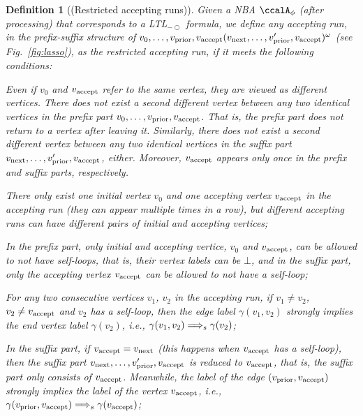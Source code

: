 \documentclass[Afour,sageh,times]{sagej}
\newtheorem{defn}[thm]{Definition}
\newcounter{listcounter}
\newenvironment{noindlist}
 {\begin{list}{(\alph{listcounter})~~}{\usecounter{listcounter} \labelsep=0em \labelwidth=0em \leftmargin=0em \itemindent=0em}}
 {\end{list}}
\newcommand{\ltl}{ {\it LTL}$_{-\bigcirc}$ }
\newcommand{\autop}{\ccalA_{\phi}}
\newcommand{\vertex}[1]{v_{\textup{#1}}}
\newcommand{\simplies}{\DOTSB\Longrightarrow}
\begin{document}
\begin{defn}[(Restricted accepting runs)]\label{defn:run}
  Given a NBA $\autop$ (after processing) that corresponds to a \ltl formula, we define  any accepting run, in the prefix-suffix structure of $v_0, \ldots, \vertex{prior}, \vertex{accept} (\vertex{next}, \ldots, \vertex{prior}', \vertex{accept})^\omega$ (see Fig.~\ref{fig:lasso}), as   the restricted accepting run,   if it  meets the following conditions:
  \begin{noindlist}
    \setlength\itemsep{0em}
  \item \label{cond:a} Even if $v_0 $ and $ \vertex{accept}$ refer to the same vertex, they are viewed as different vertices.  There does not exist a  second  different vertex between any two identical vertices  in the prefix part  $v_0, \ldots, \vertex{prior}, \vertex{accept}$. That is, the prefix part does not return to a vertex after leaving it. Similarly, there does not exist a second different vertex  between any two identical vertices in the suffix part  $\vertex{next}, \ldots, \vertex{prior}', \vertex{accept}$, either. Moreover,  $\vertex{accept}$ appears only once  in the prefix and suffix parts, respectively.
  \item \label{cond:b} There only exist one initial vertex $v_0$ and one  accepting vertex $\vertex{accept}$ in the accepting run (they can appear multiple times in a row), but different accepting runs can have different pairs of initial and accepting vertices;
  \item \label{cond:c} In the prefix part, only initial and accepting vertice, $v_0$ and $\vertex{accept}$, can be allowed to not have  self-loops, that is, their vertex labels  can be $\bot$, and in the suffix part,  only the accepting vertex $\vertex{accept}$ can be allowed to not have a self-loop;
 \item  \label{cond:d} For any two consecutive vertices $v_1$, $v_2$ in the accepting run, if $v_1 \neq v_2$, $v_2\neq \vertex{accept}$ and $v_2$ has a self-loop, then the edge label $\gamma(v_1, v_2)$  strongly implies  the end vertex label $\gamma(v_2)$, i.e., $\gamma(v_1, v_2) \simplies_s \gamma(v_2)$;
   \item \label{cond:e} In the suffix part, if $\vertex{accept} = \vertex{next}$ (this happens when $\vertex{accept}$ has a self-loop), then the suffix part $\vertex{next}, \ldots, \vertex{prior}', \vertex{accept}$ is reduced to $ \vertex{accept}$, that is, the suffix part only consists of  $\vertex{accept}$. Meanwhile, the label of the edge $(\vertex{prior}, \vertex{accept})$ strongly implies the label of the vertex $\vertex{accept}$, i.e., $\gamma(\vertex{prior}, \vertex{accept}) \simplies_s  \gamma(\vertex{accept})$;

\end{noindlist}
\end{defn}
\end{document}
